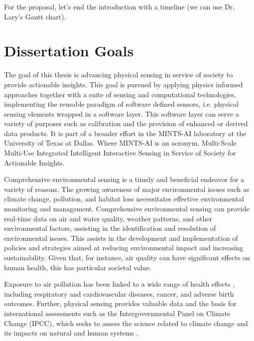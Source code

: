 For the proposal, let's end the introduction with a timeline (we can use Dr. Lary's Gantt chart).

\section{Dissertation Goals}

The goal of this thesis is advancing physical sensing in service of society to provide actionable insights. This goal is pursued by applying physics informed approaches together with a suite of sensing and computational technologies, implementing the reusable paradigm of software defined sensors, i.e. physical sensing elements wrapped in a software layer. This software layer can serve a variety of purposes such as calibration and the provision of enhanced or derived data products. It is part of a broader effort in the MINTS-AI laboratory at the University of Texas at Dallas. Where MINTS-AI is an acronym, Multi-Scale Multi-Use Integrated Intelligent Interactive Sensing in Service of Society for Actionable Insights.

Comprehensive environmental sensing is a timely and beneficial endeavor for a variety of reasons. The growing awareness of major environmental issues such as climate change, pollution, and habitat loss necessitates effective environmental monitoring and management. Comprehensive environmental sensing can provide real-time data on air and water quality, weather patterns, and other environmental factors, assisting in the identification and resolution of environmental issues. This assists in the development and implementation of policies and strategies aimed at reducing environmental impact and increasing sustainability. Given that, for instance, air quality can have significant effects on human health, this has particular societal value.

Exposure to air pollution has been linked to a wide range of health effects \cite{Brook2008, Kelly2011, Xu2017}, including respiratory and cardiovascular diseases, cancer, and adverse birth outcomes. Further, physical sensing provides valuable data and the basis for international assessments such as the Intergovernmental Panel on Climate Change (IPCC), which seeks to assess the science related to climate change and its impacts on natural and human systems \cite{IPCC1990, IPCC1995, IPCC2001, IPCC2007a, IPCC2007b, IPCC2007c, IPCC2013a, IPCC2013b, IPCC2014, IPCC2018, Friedlingstein2020, Huang2017}.

